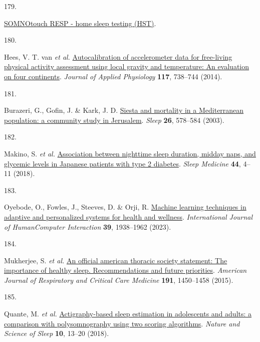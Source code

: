 \documentclass[
  10pt,
]{scrbook}
\newlength{\cslhangindent}
\newlength{\csllabelwidth}
\newlength{\cslentryspacingunit} %
\newenvironment{CSLReferences}[2] %
 {%
  \setlength{\parindent}{0pt}
  \ifodd #1
  \let\oldpar\par
  \def\par{\hangindent=\cslhangindent\oldpar}
  \fi
  \setlength{\parskip}{#2\cslentryspacingunit}
 }%
 {}
\newcommand{\CSLLeftMargin}[1]{\parbox[t]{\csllabelwidth}{#1}}
\newcommand{\CSLRightInline}[1]{\parbox[t]{\linewidth - \csllabelwidth}{#1}\break}
\let\originaltextbf\textbf
\renewcommand{\textbf}[1]{\textcolor{color1}{\textsf{\originaltextbf{#1}}}}
\begin{document}
\begin{CSLReferences}{0}{0}
\leavevmode{}%
\CSLLeftMargin{179. }%
\CSLRightInline{\href{https://somnomedics.de/enus/somnomedics-diagnostic-devices/sleep-diagnostics/home-sleep-testing-hst/somnotouch-resp-home-sleep-testing-hst/}{SOMNOtouch{\texttrademark}
RESP - home sleep testing (HST)}.}

\leavevmode{}%
\CSLLeftMargin{180. }%
\CSLRightInline{Hees, V. T. van \emph{et al.}
\href{https://doi.org/10.1152/japplphysiol.00421.2014}{Autocalibration
of accelerometer data for free-living physical activity assessment using
local gravity and temperature: An evaluation on four continents}.
\emph{Journal of Applied Physiology} \textbf{117}, 738--744 (2014).}

\leavevmode{}%
\CSLLeftMargin{181. }%
\CSLRightInline{Burazeri, G., Gofin, J. \& Kark, J. D.
\href{https://doi.org/10.1093/sleep/26.5.578}{Siesta and mortality in a
Mediterranean population: a community study in Jerusalem}. \emph{Sleep}
\textbf{26}, 578--584 (2003).}

\leavevmode{}%
\CSLLeftMargin{182. }%
\CSLRightInline{Makino, S. \emph{et al.}
\href{https://doi.org/10.1016/j.sleep.2017.11.1124}{Association between
nighttime sleep duration, midday naps, and glycemic levels in Japanese
patients with type 2 diabetes}. \emph{Sleep Medicine} \textbf{44}, 4--11
(2018).}

\leavevmode{}%
\CSLLeftMargin{183. }%
\CSLRightInline{Oyebode, O., Fowles, J., Steeves, D. \& Orji, R.
\href{https://doi.org/10.1080/10447318.2022.2089085}{Machine learning
techniques in adaptive and personalized systems for health and
wellness}. \emph{International Journal of Human{\textendash}Computer
Interaction} \textbf{39}, 1938--1962 (2023).}

\leavevmode{}%
\CSLLeftMargin{184. }%
\CSLRightInline{Mukherjee, S. \emph{et al.}
\href{https://doi.org/10.1164/rccm.201504-0767ST}{An official american
thoracic society statement: The importance of healthy sleep.
Recommendations and future priorities}. \emph{American Journal of
Respiratory and Critical Care Medicine} \textbf{191}, 1450--1458
(2015).}

\leavevmode{}%
\CSLLeftMargin{185. }%
\CSLRightInline{Quante, M. \emph{et al.}
\href{https://doi.org/10.2147/NSS.S151085}{Actigraphy-based sleep
estimation in adolescents and adults: a comparison with polysomnography
using two scoring algorithms}. \emph{Nature and Science of Sleep}
\textbf{10}, 13--20 (2018).}


\end{CSLReferences}
\end{document}
